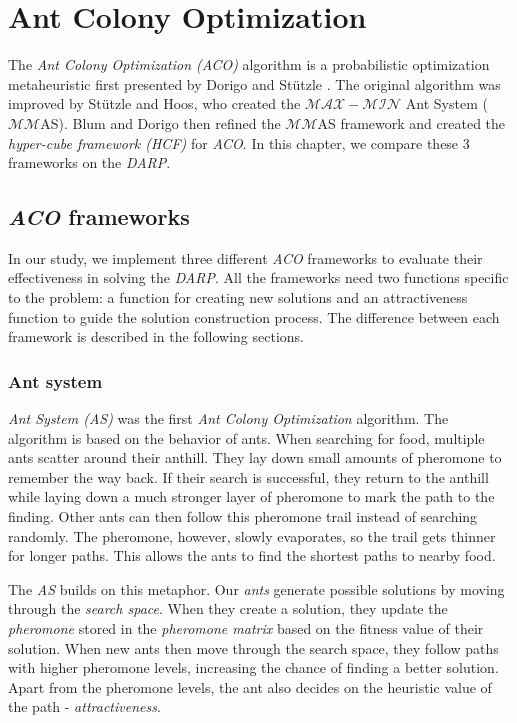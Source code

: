 \chapter{Ant Colony Optimization}\label{ch:aco}

The \textit{Ant Colony Optimization (ACO)} algorithm is a probabilistic optimization metaheuristic first presented by Dorigo and Stützle \cite{Dorigo2010}. The original algorithm was improved by Stützle and Hoos, who created the $\mathcal{MAX}\!{-}\!\mathcal{MIN}$ Ant System ($\mathcal{MM}$AS)\cite{STUTZLE2000889}. Blum and Dorigo then refined the $\mathcal{MM}$AS framework and created the \textit{hyper-cube framework (HCF)} for \textit{ACO}\cite{HCFMMAS}. In this chapter, we compare these 3 frameworks on the \textit{DARP}.

\section{\textit{ACO} frameworks}

In our study, we implement three different \textit{ACO} frameworks to evaluate their effectiveness in solving the \textit{DARP}. All the frameworks need two functions specific to the problem: a function for creating new solutions and an attractiveness function to guide the solution construction process. The difference between each framework is described in the following sections.

\subsection{Ant system}

\textit{Ant System (AS)} was the first \textit{Ant Colony Optimization} algorithm. The algorithm is based on the behavior of ants. When searching for food, multiple ants scatter around their anthill. They lay down small amounts of pheromone to remember the way back. If their search is successful, they return to the anthill while laying down a much stronger layer of pheromone to mark the path to the finding. Other ants can then follow this pheromone trail instead of searching randomly. The pheromone, however, slowly evaporates, so the trail gets thinner for longer paths. This allows the ants to find the shortest paths to nearby food.

The \textit{AS} builds on this metaphor. Our \textit{ants} generate possible solutions by moving through the \textit{search space}. When they create a solution, they update the \textit{pheromone} stored in the \textit{pheromone matrix} based on the fitness value of their solution. When new ants then move through the search space, they follow paths with higher pheromone levels, increasing the chance of finding a better solution. Apart from the pheromone levels, the ant also decides on the heuristic value of the path - \textit{attractiveness}.

